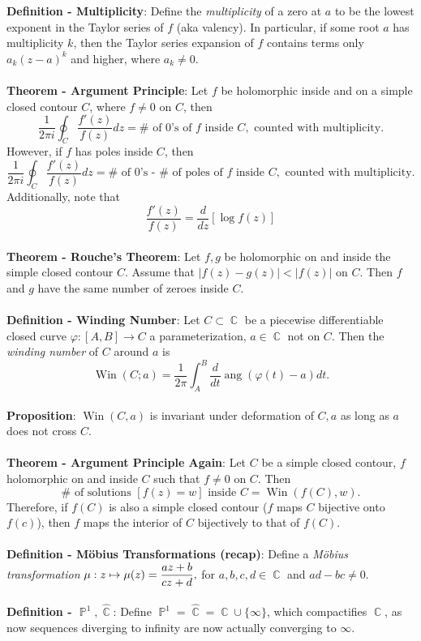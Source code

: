 \documentclass{article}
\DeclareMathOperator{\C}{\mathbb{C}}
\DeclareMathOperator{\PP}{\mathbb{P}}
\DeclareMathOperator{\ang}{ang}
\DeclareMathOperator{\win}{Win}
\begin{document}
\textbf{Definition - Multiplicity}: Define the \textit{multiplicity} of a zero at $a$ to be the lowest exponent in the Taylor series of $f$ (aka valency). In particular, if some root $a$ has multiplicity $k$, then the Taylor series expansion of $f$ contains terms only $a_k(z - a)^k$ and higher, where $a_k \neq 0$. \\ \\
\textbf{Theorem - Argument Principle}: Let $f$ be holomorphic inside and on a simple closed contour $C$, where $f \neq 0$ on $C$, then $$\frac{1}{2\pi i} \oint_C \frac{f'(z)}{f(z)}dz = \# \text{ of 0's of } f \text{ inside } C, \text{ counted with multiplicity.}$$ However, if $f$ has poles inside $C$, then $$\frac{1}{2\pi i} \oint_C \frac{f'(z)}{f(z)}dz = \# \text{ of 0's - $\#$ of poles of } f \text{ inside } C, \text{ counted with multiplicity.}$$ Additionally, note that $$\frac{f'(z)}{f(z)} = \frac{d}{dz} [\log{f(z)}]$$ \\
\textbf{Theorem - Rouche's Theorem}: Let $f, g$ be holomorphic on and inside the simple closed contour $C$. Assume that $|f(z) - g(z)| < |f(z)|$ on $C$. Then $f$ and $g$ have the same number of zeroes inside $C$. \\ \\
\textbf{Definition - Winding Number}: Let $C \subset \C$ be a piecewise differentiable closed curve $\varphi: [A, B] \rightarrow C$ a parameterization, $a \in \C$ not on $C$. Then the \textit{winding number} of $C$ around $a$ is $$\win(C; a) = \frac{1}{2\pi} \int_A^B \frac{d}{dt} \ang(\varphi(t) - a)dt.$$ \\
\textbf{Proposition}: $\win(C, a)$ is invariant under deformation of $C, a$ as long as $a$ does not cross $C$. \\ \\
\textbf{Theorem - Argument Principle Again}: Let $C$ be a simple closed contour, $f$ holomorphic on and inside $C$ such that $f \neq 0$ on $C$. Then $$\# \text{ of solutions } [f(z) = w] \text{ inside } C = \win(f(C), w).$$ Therefore, if $f(C)$ is also a simple closed contour ($f$ maps $C$ bijective onto $f(c)$), then $f$ maps the interior of $C$ bijectively to that of $f(C)$. \\ \\
\textbf{Definition - Möbius Transformations (recap)}: Define a \textit{Möbius transformation} $\mu: z \mapsto \mu(z) = \mathlarger{\frac{az + b}{cz + d}},$ for $a, b, c, d \in \C$ and $ad - bc \neq 0$. \\ \\
\textbf{Definition - $\PP^1, \hat{\C}$}: Define $\PP^1 = \hat{\C} = \C \cup \{\infty\}$, which compactifies $\C$, as now sequences diverging to infinity are now actually converging to $\infty$. \\ \\
\end{document}
